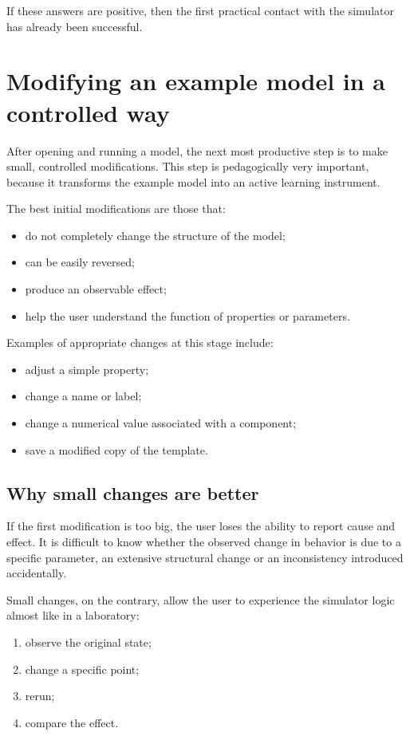 If these answers are positive, then the first practical contact with the simulator has already been successful.

\section{Modifying an example model in a controlled way}
\label{sec:cap4_modificando_modelo_controlado}

After opening and running a model, the next most productive step is to make small, controlled modifications. This step is pedagogically very important, because it transforms the example model into an active learning instrument.

The best initial modifications are those that:
\begin{itemize}
\item do not completely change the structure of the model;
\item can be easily reversed;
\item produce an observable effect;
\item help the user understand the function of properties or parameters.
\end{itemize}

Examples of appropriate changes at this stage include:
\begin{itemize}
\item adjust a simple property;
\item change a name or label;
\item change a numerical value associated with a component;
\item save a modified copy of the template.
\end{itemize}

\subsection{Why small changes are better}
\label{subsec:cap4_por_que_pequenas_mudancas}

If the first modification is too big, the user loses the ability to report cause and effect. It is difficult to know whether the observed change in behavior is due to a specific parameter, an extensive structural change or an inconsistency introduced accidentally.

Small changes, on the contrary, allow the user to experience the simulator logic almost like in a laboratory:
\begin{enumerate}
\item observe the original state;
\item change a specific point;
\item rerun;
\item compare the effect.
\end{enumerate}

